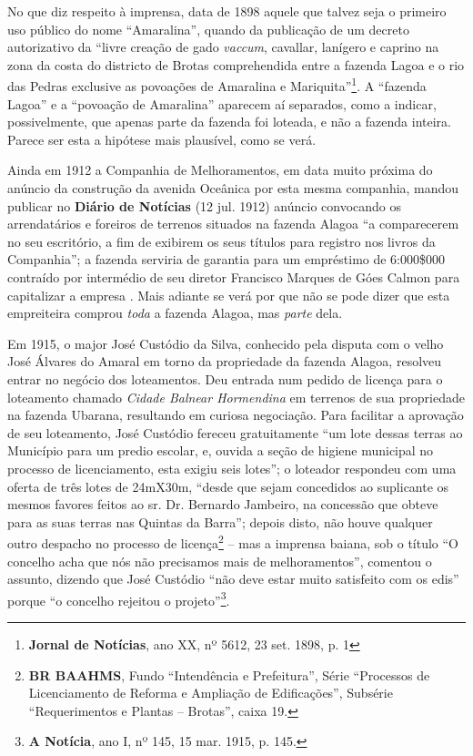 No que diz respeito à imprensa, data de 1898 aquele que talvez seja o primeiro uso público do nome ``Amaralina'', quando da publicação de um decreto autorizativo da ``livre creação de gado \textit{vaccum}, cavallar,  lanígero e caprino na zona da costa do districto de Brotas comprehendida entre a fazenda Lagoa e o rio das Pedras exclusive as povoações de Amaralina e Mariquita''\footnote{\textbf{Jornal de Notícias}, ano XX, nº 5612, 23 set. 1898, p. 1}. A ``fazenda Lagoa'' e a ``povoação de Amaralina'' aparecem aí separados, como a indicar, possivelmente, que apenas parte da fazenda foi loteada, e não a fazenda inteira. Parece ser esta a hipótese mais plausível, como se verá. 

Ainda em 1912 a Companhia de Melhoramentos, em data muito próxima do anúncio da construção da avenida Oceânica por esta mesma companhia, mandou publicar no \textbf{Diário de Notícias} (12 jul. 1912) anúncio convocando os arrendatários e foreiros de terrenos situados na fazenda Alagoa ``a comparecerem no seu escritório, a fim de exibirem os seus títulos para registro nos livros da Companhia''; a fazenda serviria de garantia para um empréstimo de 6:000\$000 contraído por intermédio de seu diretor Francisco Marques de Góes Calmon para capitalizar a empresa \cite[p.~123]{CUNHA2011}. Mais adiante se verá por que não se pode dizer que esta empreiteira comprou \textit{toda} a fazenda Alagoa, mas \textit{parte} dela.

Em 1915, o major José Custódio da Silva, conhecido pela disputa com o velho José Álvares do Amaral em torno da propriedade da fazenda Alagoa, resolveu entrar no negócio dos loteamentos.  Deu entrada num pedido de licença para o loteamento chamado \textit{Cidade Balnear Hormendina} em terrenos de sua propriedade na fazenda Ubarana, resultando em curiosa negociação. Para facilitar a aprovação de seu loteamento, José Custódio fereceu gratuitamente ``um lote dessas terras ao Município para um predio escolar, e, ouvida a seção de higiene municipal no processo de licenciamento, esta exigiu seis lotes''; o loteador respondeu com uma oferta de três lotes de 24mX30m, ``desde que sejam concedidos ao suplicante os mesmos favores feitos ao sr. Dr. Bernardo Jambeiro, na concessão que obteve para as suas terras nas Quintas da Barra''; depois disto, não houve qualquer outro despacho no processo de licença\footnote{\textbf{BR BAAHMS}, Fundo ``Intendência e Prefeitura'', Série ``Processos de Licenciamento de Reforma e Ampliação de Edificações'', Subsérie ``Requerimentos e Plantas -- Brotas'', caixa 19.} -- mas a imprensa baiana, sob o título ``O concelho acha que nós não precisamos mais de melhoramentos'', comentou o assunto, dizendo que José Custódio ``não deve estar muito satisfeito com os edis'' porque ``o concelho rejeitou o projeto''\footnote{\textbf{A Notícia}, ano I, nº 145, 15 mar. 1915, p. 145.}.

